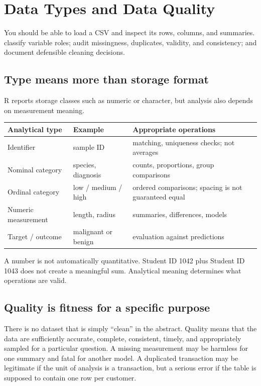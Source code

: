 \chapter{Data Types and Data Quality}
\label{chap:data-quality}
\chapterguide
  {You should be able to load a CSV and inspect its rows, columns, and summaries.}
  {classify variable roles; audit missingness, duplicates, validity, and consistency; and document defensible cleaning decisions.}

\section{Type means more than storage format}
R reports storage classes such as numeric or character, but analysis also depends on measurement meaning.

\begin{dstable}
\begin{tabularx}{\linewidth}{@{}D{2.7cm}D{4.1cm}Y@{}}
\toprule
{}
\textbf{Analytical type} & \textbf{Example} & \textbf{Appropriate operations} \\
\midrule
Identifier & sample ID & matching, uniqueness checks; not averages \\
Nominal category & species, diagnosis & counts, proportions, group comparisons \\
Ordinal category & low / medium / high & ordered comparisons; spacing is not guaranteed equal \\
Numeric measurement & length, radius & summaries, differences, models \\
Target / outcome & malignant or benign & evaluation against predictions \\
\bottomrule
\end{tabularx}
\end{dstable}

\begin{pitfall}
A number is not automatically quantitative. Student ID 1042 plus Student ID 1043 does not create a meaningful sum. Analytical meaning determines what operations are valid.
\end{pitfall}


\section{Quality is fitness for a specific purpose}
There is no dataset that is simply ``clean'' in the abstract. Quality means that the data are sufficiently accurate, complete, consistent, timely, and appropriately sampled for a particular question. A missing measurement may be harmless for one summary and fatal for another model. A duplicated transaction may be legitimate if the unit of analysis is a transaction, but a serious error if the table is supposed to contain one row per customer.

